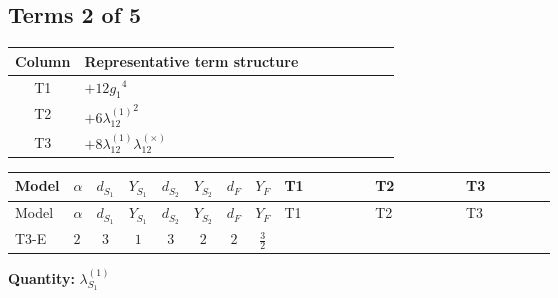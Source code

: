 \documentclass[8pt]{article}
\begin{document}
\begin{landscape}
\subsection*{Terms 2 of 5}
\begin{center}
\begin{tabular}{@{}c >{\raggedright\arraybackslash}p{0.82\linewidth}@{}}
\toprule
Column & Representative term structure \\
\midrule
T1 & \(\displaystyle +12 {g_1}^4\) \\
\midrule
T2 & \(\displaystyle +6 {\lambda_{12}^{(1)}}^2\) \\
\midrule
T3 & \(\displaystyle +8 {\lambda_{12}^{(1)}} {\lambda_{12}^{(\times)}}\) \\
\midrule
\bottomrule
\end{tabular}
\end{center}
\smallskip
\tiny
\begin{longtable}{@{}llcccccc >{\raggedright\arraybackslash}p{0.21\linewidth} >{\raggedright\arraybackslash}p{0.21\linewidth} >{\raggedright\arraybackslash}p{0.21\linewidth}@{}}
\toprule
Model & $\alpha$ & $d_{S_1}$ & $Y_{S_1}$ & $d_{S_2}$ & $Y_{S_2}$ & $d_F$ & $Y_F$ & T1 & T2 & T3 \\
\midrule
\endfirsthead
\toprule
Model & $\alpha$ & $d_{S_1}$ & $Y_{S_1}$ & $d_{S_2}$ & $Y_{S_2}$ & $d_F$ & $Y_F$ & T1 & T2 & T3 \\
\midrule
\endhead
T3-E & $2$ & $3$ & $1$ & $3$ & $2$ & $2$ & $\frac{3}{2}$ & \scriptsize\adjustbox{max width=\linewidth}{$\begin{gathered} +12 {g_1}^4\end{gathered}$} & \scriptsize\adjustbox{max width=\linewidth}{$\begin{gathered} +6 {\lambda_{12}^{(1)}}^2\end{gathered}$} & \scriptsize\adjustbox{max width=\linewidth}{$\begin{gathered} +8 {\lambda_{12}^{(1)}} {\lambda_{12}^{(\times)}}\end{gathered}$} \\
\midrule
\bottomrule
\end{longtable}
\clearpage
\noindent\textbf{Quantity: }$\lambda_{S_1}^{(1)}$\par\smallskip

\end{landscape}
\end{document}
